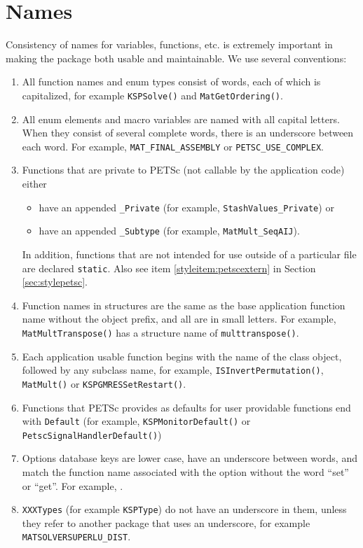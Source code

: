 \section{Names}\label{sec:stylenames}
Consistency of names for variables, functions, etc. is extremely
important in making the package both usable and maintainable.
We use several conventions:
\begin{enumerate}
\item All function names and enum types consist of words, each of
  which is capitalized, for example \lstinline{KSPSolve()} and
      \lstinline{MatGetOrdering()}.
\item All enum elements and macro variables are named with all capital letters. When
      they consist of several complete words, there is an underscore between each word. 
      For example, \lstinline{MAT_FINAL_ASSEMBLY} or \lstinline{PETSC_USE_COMPLEX}.
\item Functions that are private to PETSc (not callable by the
      application code) either
      \begin{itemize}
        \item have an appended \lstinline{_Private} (for example,
           \lstinline{StashValues_Private}) or
        \item have an appended \lstinline{_Subtype} (for example,
           \lstinline{MatMult_SeqAIJ}).
      \end{itemize}

      In addition, functions that are not intended for use outside
      of a particular file are declared \lstinline{static}. 
      Also see item \ref{styleitem:petscextern} in Section \ref{sec:stylepetsc}.
\item Function names in structures are the same as the base application
      function name without the object prefix, and all are in small letters.
      For example, \lstinline{MatMultTranspose()} has a structure name of
      \lstinline{multtranspose()}.
\item Each application usable function begins with the name of the class object, followed by any subclass name,
  for example, \lstinline{ISInvertPermutation()}, \lstinline{MatMult()} or \lstinline{KSPGMRESSetRestart()}.
\item Functions that PETSc provides as defaults for user providable functions end with \lstinline{Default} (for example, \lstinline{KSPMonitorDefault()} or \lstinline{PetscSignalHandlerDefault()})
\item Options database keys are lower case, have an underscore between words, and match the function name associated with the option without the word ``set'' or ``get''.
For example, .
\item \lstinline{XXXTypes} (for example \lstinline{KSPType}) do not have an underscore in them, unless they refer to another package that uses an underscore, for example \lstinline{MATSOLVERSUPERLU_DIST}.
\end{enumerate}


